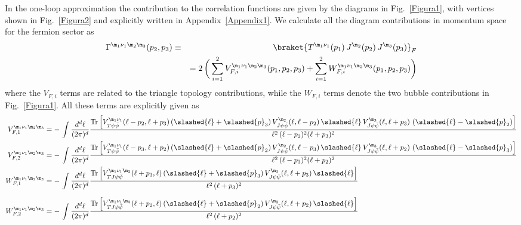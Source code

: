 \documentclass[a4paper,11pt,openright,twoside]{book}
\let\n=\nu      \let\x=\xi     \let\p=\pi      \let\r=\rho
\newcommand{\figref}[1]{Fig.~\ref{#1}}			%
\newcommand{\appref}[1]{Appendix~\ref{#1}}		%
\newcommand{\Tr}{\text{Tr}}
\numberwithin{equation}{section}
\begin{document}
{{In the one-loop approximation the contribution to the correlation functions are given by the diagrams in \figref{Figura1}, with vertices shown in \figref{Figura2} and explicitly written in \appref{Appendix1}. We calculate all the diagram contributions in momentum space for the fermion sector as
\begin{eqnarray}
	\Gamma^{\m_1\n_1\m_2\m_3}(p_2,p_3)&\equiv&\braket{T^{\m_1\n_1}(p_1)\,J^{\m_2}(p_2)\,J^{\m_3}(p_3)}_F\notag\\
	&&=2\,\bigg(\sum_{i=1}^2V_{F,i}^{\m_1\n_1\m_2\m_3}(p_1,p_2,p_3)+\sum_{i=1}^{2}W_{F,i}^{\m_1\n_1\m_2\m_3}(p_1,p_2,p_3)\bigg)
\end{eqnarray}
where the $V_{F,i}$ terms are related to the triangle topology contributions, while the $W_{F,i}$ terms denote the two bubble contributions in \figref{Figura1}. All these terms are explicitly given as
\begin{align}
	V_{F,1}^{\m_1\n_1\m_2\m_3}&=-\,\int\frac{d^d\ell}{(2\p)^d}\frac{\Tr\left[V^{\m_1\n_1}_{T\psi\bar\psi}(\ell-p_2,\ell+p_3)\left(\slashed{\ell}+\slashed{p}_3\right)V^{\m_2}_{J\psi\bar\psi}(\ell,\ell-p_2)\,\slashed{\ell}\,V^{\m_3}_{J\psi\bar\psi}(\ell,\ell+p_3)\,\left(\slashed{\ell}-\slashed{p}_2\right)\right]}{\ell^2\,(\ell-p_2)^2(\ell+p_3)^2}\\
	V_{F,2}^{\m_1\n_1\m_2\m_3}&=-\,\int\frac{d^d\ell}{(2\p)^d}\frac{\Tr\left[V^{\m_1\n_1}_{T\psi\bar\psi}(\ell-p_3,\ell+p_2)\left(\slashed{\ell}+\slashed{p}_2\right)V^{\m_2}_{J\psi\bar\psi}(\ell,\ell-p_3)\,\slashed{\ell}\,V^{\m_3}_{J\psi\bar\psi}(\ell,\ell+p_2)\,\left(\slashed{\ell}-\slashed{p}_3\right)	\right]}{\ell^2\,(\ell-p_3)^2(\ell+p_2)^2}\\
	W_{F,1}^{\m_1\n_1\m_2\m_3}&=-\,\int\frac{d^d\ell}{(2\p)^d}\frac{\Tr\left[V^{\m_1\n_1\m_2}_{TJ\psi\bar\psi}(\ell+p_3,\ell)\left(\slashed{\ell}+\slashed{p}_3\right)V^{\m_3}_{J\psi\bar\psi}(\ell,\ell+p_3)\,\slashed{\ell}\right]}{\ell^2\,(\ell+p_3)^2}\\[1.5ex]
	W_{F,2}^{\m_1\n_1\m_2\m_3}&=-\,\int\frac{d^d\ell}{(2\p)^d}\frac{\Tr\left[V^{\m_1\n_1\m_3}_{TJ\psi\bar\psi}(\ell+p_2,\ell)\left(\slashed{\ell}+\slashed{p}_2\right)V^{\m_2}_{J\psi\bar\psi}(\ell,\ell+p_2)\,\slashed{\ell}\right]}{\ell^2\,(\ell+p_2)^2}
\end{align}
}}
\end{document}
